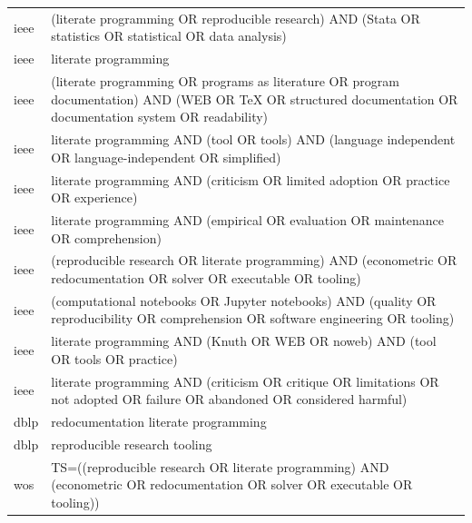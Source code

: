 \documentclass{article}
\begin{document}
\begin{longtable}{lp{10cm}}
ieee & (\textquotedbl{}literate programming\textquotedbl{} OR \textquotedbl{}reproducible research\textquotedbl{}) AND (Stata OR statistics OR statistical OR \textquotedbl{}data analysis\textquotedbl{}) \\
ieee & \textquotedbl{}literate programming\textquotedbl{} \\
ieee & (\textquotedbl{}literate programming\textquotedbl{} OR \textquotedbl{}programs as literature\textquotedbl{} OR \textquotedbl{}program documentation\textquotedbl{}) AND (WEB OR TeX OR \textquotedbl{}structured documentation\textquotedbl{} OR \textquotedbl{}documentation system\textquotedbl{} OR readability) \\
ieee & \textquotedbl{}literate programming\textquotedbl{} AND (tool OR tools) AND (\textquotedbl{}language independent\textquotedbl{} OR \textquotedbl{}language-independent\textquotedbl{} OR simplified) \\
ieee & \textquotedbl{}literate programming\textquotedbl{} AND (criticism OR \textquotedbl{}limited adoption\textquotedbl{} OR practice OR experience) \\
ieee & \textquotedbl{}literate programming\textquotedbl{} AND (empirical OR evaluation OR maintenance OR comprehension) \\
ieee & (\textquotedbl{}reproducible research\textquotedbl{} OR \textquotedbl{}literate programming\textquotedbl{}) AND (econometric OR redocumentation OR solver OR executable OR tooling) \\
ieee & (\textquotedbl{}computational notebooks\textquotedbl{} OR \textquotedbl{}Jupyter notebooks\textquotedbl{}) AND (quality OR reproducibility OR comprehension OR \textquotedbl{}software engineering\textquotedbl{} OR tooling) \\
ieee & \textquotedbl{}literate programming\textquotedbl{} AND (Knuth OR WEB OR noweb) AND (tool OR tools OR practice) \\
ieee & \textquotedbl{}literate programming\textquotedbl{} AND (criticism OR critique OR limitations OR \textquotedbl{}not adopted\textquotedbl{} OR failure OR abandoned OR \textquotedbl{}considered harmful\textquotedbl{}) \\
dblp & redocumentation literate programming \\
dblp & reproducible research tooling \\
wos & TS=((\textquotedbl{}reproducible research\textquotedbl{} OR \textquotedbl{}literate programming\textquotedbl{}) AND (econometric OR redocumentation OR solver OR executable OR tooling)) \\

\end{longtable}
\end{document}
